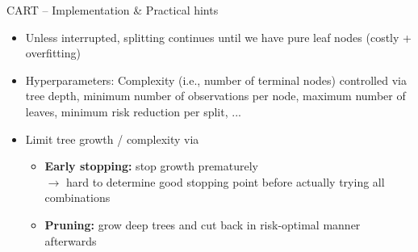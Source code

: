 \begin{frame}{CART -- Implementation \& Practical hints}

\footnotesize


\begin{itemize}
  \item Unless interrupted, splitting continues until we have pure leaf nodes (costly + overfitting)
  \item Hyperparameters: Complexity (i.e., number of terminal nodes) controlled via tree depth, minimum number of observations per node, maximum number of leaves, minimum risk reduction per split, ...
  \item Limit tree growth / complexity via
  \begin{itemize}
    \item \textbf{Early stopping:} stop growth prematurely \\ $\rightarrow$ hard 
    to determine good stopping point before actually trying all combinations
    \item \textbf{Pruning:} grow deep trees and cut back in risk-optimal manner afterwards
  \end{itemize}
\end{itemize}

\medskip

   

\end{frame}
